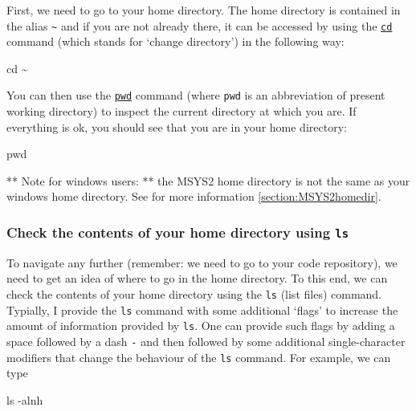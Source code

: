 \documentclass[
]{book}
\newenvironment{Shaded}{\begin{snugshade}}{\end{snugshade}}
\newcommand{\AttributeTok}[1]{\textcolor[rgb]{0.77,0.63,0.00}{#1}}
\newcommand{\BuiltInTok}[1]{#1}
\newcommand{\FunctionTok}[1]{\textcolor[rgb]{0.00,0.00,0.00}{#1}}
\newcommand{\NormalTok}[1]{#1}
\begin{document}
First, we need to go to your home directory. The home directory is contained in the alias \texttt{\textasciitilde{}} and if you are not already there, it can be accessed by using the \href{https://www.tutorialspoint.com/unix_commands/cd.htm}{\texttt{cd}} command (which stands for `change directory') in the following way:

\begin{Shaded}
\begin{Highlighting}[]
\BuiltInTok{cd}\NormalTok{ \textasciitilde{}}
\end{Highlighting}
\end{Shaded}

You can then use the \href{https://phoenixnap.com/kb/pwd-linux}{\texttt{pwd}} command (where \texttt{pwd} is an abbreviation of present working directory) to inspect the current directory at which you are. If everything is ok, you should see that you are in your home directory:

\begin{Shaded}
\begin{Highlighting}[]
\BuiltInTok{pwd}
\end{Highlighting}
\end{Shaded}

** Note for windows users: ** the MSYS2 home directory is not the same as your windows home directory. See for more information \ref{section:MSYS2homedir}.

\hypertarget{check-the-contents-of-your-home-directory-using-ls}{%
\subsubsection{\texorpdfstring{Check the contents of your home directory using \texttt{ls}}{Check the contents of your home directory using ls}}\label{check-the-contents-of-your-home-directory-using-ls}}

To navigate any further (remember: we need to go to your code repository), we need to get an idea of where to go in the home directory. To this end, we can check the contents of your home directory using the \texttt{ls} (list files) command. Typially, I provide the \texttt{ls} command with some additional `flags' to increase the amount of information provided by \texttt{ls}. One can provide such flags by adding a space followed by a dash \texttt{-} and then followed by some additional single-character modifiers that change the behaviour of the \texttt{ls} command. For example, we can type

\begin{Shaded}
\begin{Highlighting}[]
\FunctionTok{ls} \AttributeTok{{-}alnh}
\end{Highlighting}
\end{Shaded}
\end{document}
